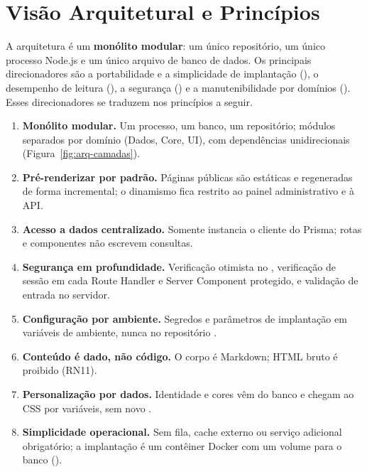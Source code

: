 
\section{Visão Arquitetural e Princípios}\label{sec:arq-visao}

A arquitetura é um \textbf{monólito modular}: um único repositório, um único processo Node.js e um único arquivo de banco de dados. Os principais direcionadores são a portabilidade e a simplicidade de implantação (), o desempenho de leitura (), a segurança () e a manutenibilidade por domínios (). Esses direcionadores se traduzem nos princípios a seguir.

\begin{enumerate}[label=\textbf{PA\arabic*.}, leftmargin=1.6cm]
  \item \textbf{Monólito modular.} Um processo, um banco, um repositório; módulos separados por domínio (Dados, Core, UI), com dependências unidirecionais (Figura~\ref{fig:arq-camadas}).
  \item \textbf{Pré-renderizar por padrão.} Páginas públicas são estáticas e regeneradas de forma incremental; o dinamismo fica restrito ao painel administrativo e à API.
  \item \textbf{Acesso a dados centralizado.} Somente  instancia o cliente do Prisma; rotas e componentes não escrevem consultas.
  \item \textbf{Segurança em profundidade.} Verificação otimista no , verificação de sessão em cada Route Handler e Server Component protegido, e validação de entrada no servidor.
  \item \textbf{Configuração por ambiente.} Segredos e parâmetros de implantação em variáveis de ambiente, nunca no repositório \cite{twelvefactor}.
  \item \textbf{Conteúdo é dado, não código.} O corpo é Markdown; HTML bruto é proibido (RN11).
  \item \textbf{Personalização por dados.} Identidade e cores vêm do banco e chegam ao CSS por variáveis, sem novo .
  \item \textbf{Simplicidade operacional.} Sem fila, cache externo ou serviço adicional obrigatório; a implantação é um contêiner Docker com um volume para o banco ().
\end{enumerate}

